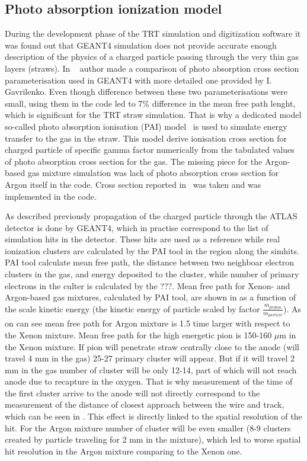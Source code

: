\subsection{Photo absorption ionization model}
\label{subsec:pai_model}
During the development phase of the TRT simulation and digitization software it was found out that GEANT4 simulation does not provide accurate enough description of the physics
of a charged particle passing through the very thin gas layers (straws). 
In ~\cite{kittelmann_thesis} author made a comparison of photo absorption cross section parameterisation used in GEANT4 with more detailed one provided by I. Gavrilenko.
Even though difference between these two parameterisations were small, using them in the code led to 7$\%$ difference in the mean free path lenght, which is significant for the TRT straw simulation.
That is why a dedicated model so-called photo absorption ionisation (PAI) model~\cite{pai_model_paper} is used to simulate energy transfer to the gas in the straw.
This model derive ionisation cross section for charged particle of specific gamma factor numerically from the tabulated values of photo absorption cross section for the gas.
The missing piece for the Argon-based gas mixture simulation was lack of photo absorption cross section for Argon itself in the code.
Cross section reported in~\cite{argon_cross_section} was taken and was implemented in the code.

As described previously propagation of the charged particle through the ATLAS detector is done by GEANT4, which in practise correspond to the list of simulation hits in the detector.
These hits are used as a reference while real ionization clusters are calculated by the PAI tool in the region along the simhits.
PAI tool calculate mean free path, the distance between two neighboar electron clusters in the gas, and energy deposited to the cluster, while number of primary electrons in the culter is
calculated by the ???. Mean free path for Xenon- and Argon-based gas mixtures, calculated by PAI tool, are shown in  as a function of the scale kinetic energy 
(the kinetic energy of particle scaled by factor $\frac{m_{proton}}{m_{particle}}$). As on can see mean free path for Argon mixture is 1.5 time larger with respect to the Xenon mixture.
Mean free path for the high energetic pion is 150-160 $\mu$m in the Xenon mixture. If pion will penetrate straw centrally close to the anode (will travel 4 mm in the gas) 25-27 primary cluster will appear.
But if it will travel 2 mm in the gas number of cluster will be only 12-14, part of which will not reach anode due to recapture in the oxygen. 
That is why measurement of the time of the first cluster arrive to the anode will not directly correspond to the measurement of the distance of closest approach between the wire and track, 
which can be seen in . This effect is directly linked to the spatial resolution of the hit.
For the Argon mixture number of cluster will be even smaller (8-9 clusters created by particle traveling for 2 mm in the mixture), which led to worse spatial hit resolution in the Argon mixture comparing 
to the Xenon one.

